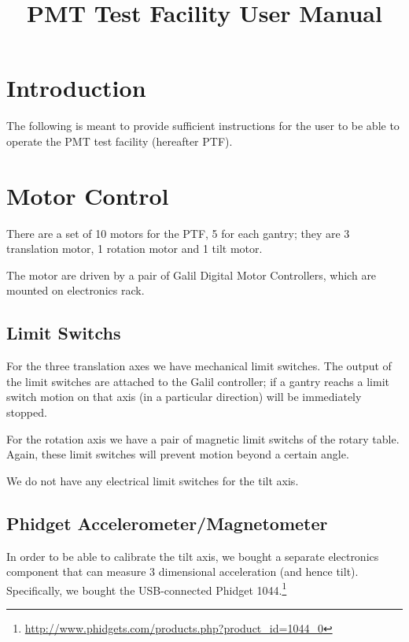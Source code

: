 \documentclass[a4paper,12pt]{article}
\begin{document}
\title{
PMT Test Facility User Manual}

\maketitle

\section{Introduction}

The following is meant to provide sufficient instructions for the user to be able to operate the PMT 
test facility (hereafter PTF).

\section{Motor Control}

There are a set of 10 motors for the PTF, 5 for each gantry; they are 3 translation motor, 1 rotation motor and 
1 tilt motor.

The motor are driven by a pair of Galil Digital Motor Controllers, which are mounted on electronics rack.

\subsection{Limit Switchs}

For the three translation axes we have mechanical limit switches. The output of the limit switches are
attached to the Galil controller; if a gantry reachs a limit switch motion on that axis (in a particular direction)
will be immediately stopped.

For the rotation axis we have a pair of magnetic limit switchs of the rotary table.  Again, these limit
switches will prevent motion beyond a certain angle.

We do not have any electrical limit switches for the tilt axis.

\subsection{Phidget Accelerometer/Magnetometer}

In order to be able to calibrate the tilt axis, we bought a separate electronics component that 
can measure 3 dimensional acceleration (and hence tilt).  Specifically, we bought the USB-connected
Phidget 1044.\footnote{\url{http://www.phidgets.com/products.php?product\_id=1044\_0}}
\end{document}
